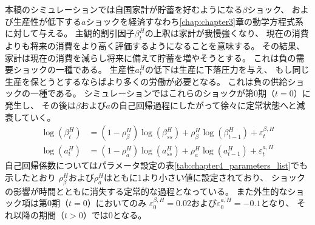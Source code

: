 
本稿のシミュレーションでは自国家計が貯蓄を好むようになる\(\beta\)ショック、
および生産性が低下する\(a\)ショックを経済すなわち\ref{chap:chapter3}章の動学方程式系に対して与える。
主観的割引因子\(\beta_t^H\)の上釈は家計が我慢強くなり、
現在の消費よりも将来の消費をより高く評価するようになることを意味する。
その結果、家計は現在の消費を減らし将来に備えて貯蓄を増やそうとする。
これは負の需要ショックの一種である。
生産性\(a_t^H\)の低下は生産に下落圧力を与え、
もし同じ生産を保とうとするならばより多くの労働が必要となる。
これは負の供給ショックの一種である。
シミュレーションではこれらのショックが第0期（\(t=0\)）に発生し、
その後は\(\beta\)および\(a\)の自己回帰過程にしたがって徐々に定常状態へと減衰していく。
\begin{align}
    \label{form:chapter4_shocks_beta_eq}
        \log(\beta_t^H)&=(1-\rho_{\beta}^H)\log(\beta_{ss}^H)+\rho_{\beta}^H\log(\beta_{t-1}^H)+\varepsilon_t^{\beta,H} \\
    \label{form:chapter4_shocks_a_eq}
        \log(a_t^H)&=(1-\rho_{a}^H)\log(a_{ss}^H)+\rho_{a}^H\log(a_{t-1}^H)+\varepsilon_t^{a,H}
\end{align}
自己回帰係数についてはパラメータ設定の表\ref{tab:chapter4_parameters_list}でも示したとおり
\(\rho_{\beta}^H\)および\(\rho_{a}^H\)はともに1より小さい値に設定されており、
ショックの影響が時間とともに消失する定常的な過程となっている。
また外生的なショック項は第0期（\(t=0\)）においてのみ
\(\varepsilon_0^{\beta,H}=0.02\)および\(\varepsilon_0^{a,H}=-0.1\)となり、
それ以降の期間（\(t>0\)）では0となる。